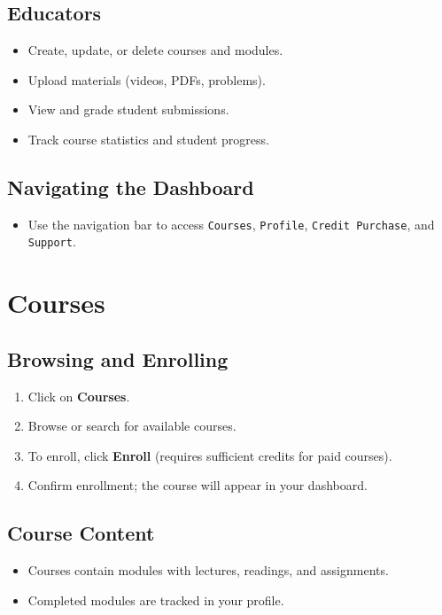 \documentclass[a4paper,11pt]{scrartcl}
\begin{document}
\subsection{Educators}
\begin{itemize}[leftmargin=*]
    \item Create, update, or delete courses and modules.
    \item Upload materials (videos, PDFs, problems).
    \item View and grade student submissions.
    \item Track course statistics and student progress.
\end{itemize}

\subsection{Navigating the Dashboard}
\begin{itemize}[leftmargin=*]
    \item Use the navigation bar to access \texttt{Courses}, \texttt{Profile}, \texttt{Credit Purchase}, and \texttt{Support}.
\end{itemize}

\section{Courses}

\subsection{Browsing and Enrolling}
\begin{enumerate}[leftmargin=*]
    \item Click on \textbf{Courses}.
    \item Browse or search for available courses.
    \item To enroll, click \textbf{Enroll} (requires sufficient credits for paid courses).
    \item Confirm enrollment; the course will appear in your dashboard.
\end{enumerate}

\subsection{Course Content}
\begin{itemize}[leftmargin=*]
    \item Courses contain modules with lectures, readings, and assignments.
    \item Completed modules are tracked in your profile.
\end{itemize}
\end{document}
